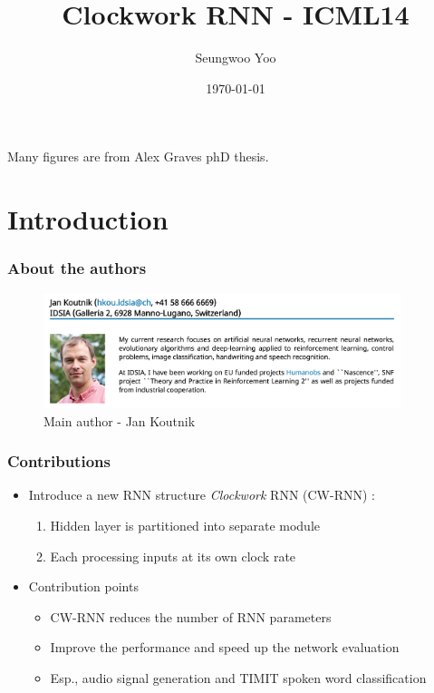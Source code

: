 \documentclass{beamer}
\title{Clockwork RNN - ICML14}
\author{Seungwoo Yoo}
\date{\today}
\begin{document}
\begin{frame}
  \vspace*{1.5cm}\titlepage  
  \centering Many figures are from Alex Graves phD thesis. 
\end{frame}

\section[Outline]{}
\frame{\tableofcontents}

\section{Introduction}
\frame
{
	\frametitle{About the authors}
    \begin{figure}[ht]  
		\begin{center}
			\includegraphics[width=4.1in]{Images/author.png}   
		\end{center}   
		\caption{Main author - Jan Koutnik}
	\end{figure}
}
\frame
{
	\frametitle{Contributions}
	\begin{itemize}
        \item Introduce a new RNN structure \textit{Clockwork} RNN (CW-RNN) :
			\begin{enumerate}
			\item Hidden layer is partitioned into separate module
			\item Each processing inputs at its own clock rate
			\end{enumerate}
		\item Contribution points
			\begin{itemize}
			\item CW-RNN reduces the number of RNN parameters
			\item Improve the performance and speed up the network evaluation
            \item Esp., audio signal generation and TIMIT spoken word classification
			\end{itemize}
	\end{itemize}
}
\end{document}
